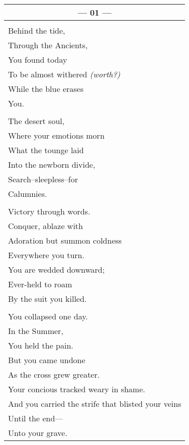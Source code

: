 \documentclass{article}
\begin{document}
\begin{center}
\begin{tabular}{l}
\multicolumn{1}{c}{\textbf{--- 01 ---}} \\ \hline
\\
Behind the tide, \\
Through the Ancients, \\
You found today \\
To be almost withered \textit{(worth?)}\\
While the blue erases \\
You. \\
\\
The desert soul, \\
Where your emotions morn \\
What the tounge laid \\
Into the newborn divide, \\
Search--sleepless--for \\
Calumnies. \\
\\
Victory through words. \\
Conquer, ablaze with \\
Adoration but summon coldness \\
Everywhere you turn. \\
You are wedded downward; \\
Ever-held to roam \\
By the suit you killed. \\
\\
You collapsed one day. \\
In the Summer, \\
You held the pain. \\
But you came undone \\
As the cross grew greater. \\
Your concious tracked weary in shame. \\
And you carried the strife that blisted your veins \\
Until the end--- \\
Unto your grave.
\end{tabular}
\end{center}

\newpage
\end{document}
